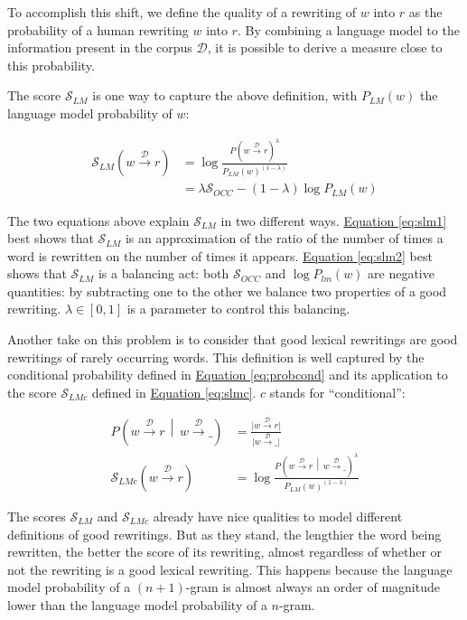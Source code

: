 \documentclass[a4paper, 11pt, onepage]{scrreprt}
\newcommand\equaref[1]{\hyperref[#1]{Equation \ref*{#1}}}
\newcommand\maps[1]{\xrightarrow{\mathcal{#1}}}
\newcommand\card[1]{\lvert #1 \rvert}
\newcommand\given{\, \middle| \,}
\newcommand\proba[2][]{P_{#1} \left( #2 \right)}
\begin{document}
To accomplish this shift, we define the quality of a rewriting of $w$
into $r$ as the probability of a human rewriting $w$ into $r$. By
combining a language model to the information present in the corpus
$\mathcal{D}$, it is possible to derive a measure close to this
probability.

The score $\mathcal{S}_{LM}$ is one way to capture the above
definition, with $\proba[LM]{w}$ the language model probability of
$w$:

\begin{align}
  \label{eq:slm1}
  \mathcal{S}_{LM}(w \maps{D} r) & = \log \frac{\proba{w \maps{D} r}^\lambda}%
  {\proba[LM]{w}^{(1 - \lambda)}} \\
  \label{eq:slm2}
  & = \lambda \mathcal{S}_{OCC} - (1 - \lambda) \log \proba[LM]{w}
\end{align}

The two equations above explain $\mathcal{S}_{LM}$ in two different
ways. \equaref{eq:slm1} best shows that $\mathcal{S}_{LM}$ is an
approximation of the ratio of the number of times a word is rewritten
on the number of times it appears. \equaref{eq:slm2} best shows that
$\mathcal{S}_{LM}$ is a balancing act: both $\mathcal{S}_{OCC}$ and
$\log \proba[lm]{w}$ are negative quantities: by subtracting one to
the other we balance two properties of a good rewriting. $\lambda \in
\left[0,1\right]$ is a parameter to control this balancing.

Another take on this problem is to consider that good lexical
rewritings are good rewritings of rarely occurring words. This
definition is well captured by the conditional probability defined in
\equaref{eq:probcond} and its application to the score
$\mathcal{S}_{LMc}$ defined in \equaref{eq:slmc}. $c$ stands for
“conditional”:

\begin{align}
  \label{eq:probcond}
  \proba{w \maps{D} r \given w \maps{D} \_} & = \frac%
  {\card{w \maps{D} r}}%
  {\card{w \maps{D} \_}} \\
  \label{eq:slmc}
  \mathcal{S}_{LMc}(w \maps{D} r) & = \log \frac%
  {\proba{w \maps{D} r \given w \maps{D} \_}^\lambda}%
  {\proba[LM]{w}^{(1 - \lambda)}}
\end{align}

The scores $\mathcal{S}_{LM}$ and $\mathcal{S}_{LMc}$ already have
nice qualities to model different definitions of good rewritings. But
as they stand, the lengthier the word being rewritten, the better the
score of its rewriting, almost regardless of whether or not the
rewriting is a good lexical rewriting. This happens because the
language model probability of a $(n+1)$-gram is almost always an order
of magnitude lower than the language model probability of a
$n$-gram.
\end{document}
